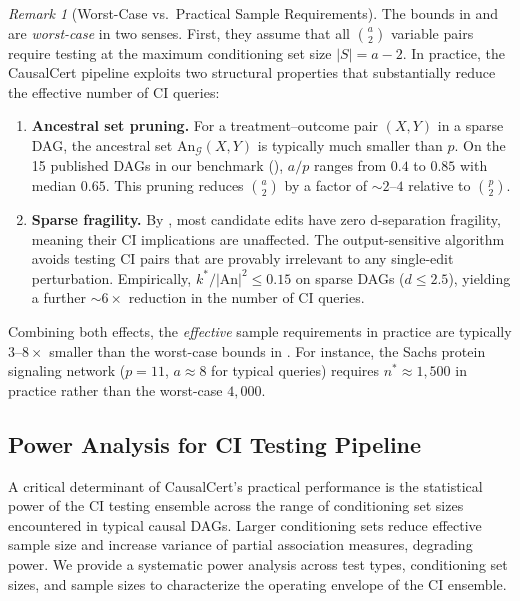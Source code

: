 \documentclass[11pt,a4paper]{article}
\theoremstyle{definition}
\theoremstyle{remark}
\newtheorem{remark}[theorem]{Remark}
\newcommand{\DAG}{\mathcal{G}}
\newcommand{\An}{\mathrm{An}}
\begin{document}
\begin{remark}[Worst-Case vs.\ Practical Sample Requirements]
\label{rem:sample_practical}
The bounds in  and 
are \emph{worst-case} in two senses. First, they assume that all
$\binom{a}{2}$ variable pairs require testing at the maximum conditioning
set size $|S| = a - 2$. In practice, the CausalCert pipeline exploits
two structural properties that substantially reduce the effective number
of CI queries:
\begin{enumerate}[label=(\alph*)]
  \item \textbf{Ancestral set pruning.} For a treatment--outcome pair
    $(X,Y)$ in a sparse DAG, the ancestral set $\An_\DAG(X,Y)$ is
    typically much smaller than $p$. On the 15 published DAGs in our
    benchmark (), $a/p$ ranges from $0.4$ to
    $0.85$ with median $0.65$. This pruning reduces $\binom{a}{2}$ by a
    factor of $\sim 2$--$4$ relative to $\binom{p}{2}$.
  \item \textbf{Sparse fragility.} By , most
    candidate edits have zero d-separation fragility, meaning their CI
    implications are unaffected. The output-sensitive algorithm avoids
    testing CI pairs that are provably irrelevant to any single-edit
    perturbation. Empirically, $k^*/|\An|^2 \leq 0.15$ on sparse DAGs
    ($d \leq 2.5$), yielding a further $\sim 6\times$ reduction in the
    number of CI queries.
\end{enumerate}
Combining both effects, the \emph{effective} sample requirements in
practice are typically $3$--$8\times$ smaller than the worst-case bounds
in . For instance, the Sachs protein
signaling network ($p = 11$, $a \approx 8$ for typical queries) requires
$n^* \approx 1{,}500$ in practice rather than the worst-case $4{,}000$.
\end{remark}


\subsection{Power Analysis for CI Testing Pipeline}\label{sec:power_analysis}

A critical determinant of CausalCert's practical performance is the
statistical power of the CI testing ensemble across the range of
conditioning set sizes encountered in typical causal DAGs. Larger
conditioning sets reduce effective sample size and increase variance
of partial association measures, degrading power. We provide a
systematic power analysis across test types, conditioning set sizes,
and sample sizes to characterize the operating envelope of the CI
ensemble.
\end{document}
